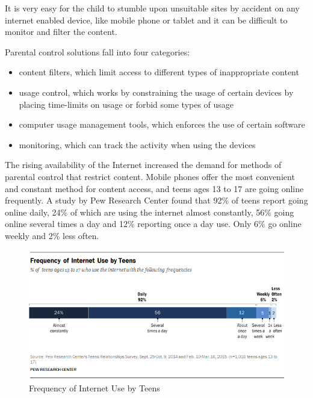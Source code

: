 It is very easy for the child to stumble upon unsuitable sites by accident on any internet enabled device, like mobile phone or tablet and it can be difficult to monitor and filter the content. \parencite{innapropriateContent}

Parental control solutions fall into four categories:

\begin{itemize}
\item content filters, which limit access to different types of inappropriate content
\item usage control, which works by constraining the usage of certain devices by placing time-limits on usage or forbid some types of usage
\item computer usage management tools, which enforces the use of certain software
\item monitoring, which can track the activity when using the devices
\end{itemize}

The rising availability of the Internet increased the demand for methods of parental control that restrict content. Mobile phones offer the most convenient and constant method for content access, and teens ages 13 to 17 are going online frequently. A study by Pew Research Center found that 92\% of teens report going online daily, 24\% of which are using the internet almost constantly, 56\% going online several times a day and 12\% reporting once a day use. Only 6\% go online weekly and 2\% less often. \parencite{lenhart2015teens}

\begin{figure}[th]
\centering
\includegraphics[width=1\textwidth]{Figures/frequency-of-internet-use-by-teens}
\decoRule
\caption[Frequency of Internet Use by Teens]{Frequency of Internet Use by Teens}
\label{fig:frequency-of-internet-use-by-teens}
\end{figure}

